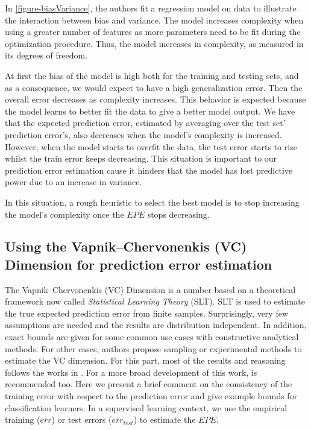 In \cref{figure-biasVariance}, the authors fit a regression model on data to illustrate the interaction between bias and variance. The model increases complexity when using a greater number of features as more parameters need to be fit during the optimization procedure. Thus, the model increases in complexity, as measured in its degrees of freedom.

At first the bias of the model is high both for the training and testing sets, and as a consequence, we would expect to have a high generalization error. Then the overall error decreases as complexity increases. This behavior is expected because the model learns to better fit the data to give a better model output. We have that the expected prediction error, estimated by averaging over the test set' prediction error's, also decreases when the model's complexity is increased. However, when the model starts to overfit the data, the test error starts to rise whilst the train error keeps decreasing. This situation is important to our prediction error estimation cause it hinders that the model has lost predictive power due to an increase in variance.

In this situation, a rough heuristic to select the best model is to stop increasing the model's complexity once the $EPE$ stops decreasing.

\subsection{ Using the Vapnik--Chervonenkis (VC) Dimension for prediction error estimation} \label{section-VcDimension}


The Vapnik--Chervonenkis (VC) Dimension is a number based on a theoretical framework now called \textit{Statistical Learning Theory} (SLT). SLT is used to estimate the true expected prediction error from finite samples. Surprisingly, very few assumptions are needed and the results are distribution independent. In addition, exact bounds are given for some common use cases with constructive analytical methods. For other cases, authors propose sampling or experimental methods to estimate the VC dimension. For this part, most of the results and reasoning follows the works in \textcite{cherkassky-learning2007}. For a more broad development of this work, \textcite{vapnik-nature2013} is recommended too. Here we present a brief comment on the consistency of the training error with respect to the prediction error and give example bounds for classification learners. In a supervised learning context, we use the empirical training ($\overline{err}$) or test errors ($\overline{err}_{test}$) to estimate the $EPE$.

